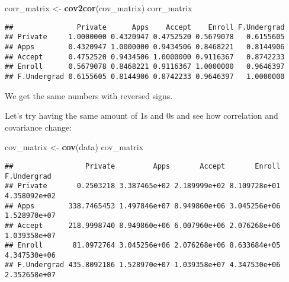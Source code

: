 \documentclass[]{article}
\newenvironment{Shaded}{\begin{snugshade}}{\end{snugshade}}
\newcommand{\DecValTok}[1]{\textcolor[rgb]{0.00,0.00,0.81}{#1}}
\newcommand{\KeywordTok}[1]{\textcolor[rgb]{0.13,0.29,0.53}{\textbf{#1}}}
\newcommand{\NormalTok}[1]{#1}
\newcommand{\OperatorTok}[1]{\textcolor[rgb]{0.81,0.36,0.00}{\textbf{#1}}}
\newcommand{\StringTok}[1]{\textcolor[rgb]{0.31,0.60,0.02}{#1}}
\begin{document}
\begin{Shaded}
\begin{Highlighting}[]
\NormalTok{corr_matrix <-}\StringTok{ }\KeywordTok{cov2cor}\NormalTok{(cov_matrix)}
\NormalTok{corr_matrix}
\end{Highlighting}
\end{Shaded}

\begin{verbatim}
##               Private      Apps    Accept    Enroll F.Undergrad
## Private     1.0000000 0.4320947 0.4752520 0.5679078   0.6155605
## Apps        0.4320947 1.0000000 0.9434506 0.8468221   0.8144906
## Accept      0.4752520 0.9434506 1.0000000 0.9116367   0.8742233
## Enroll      0.5679078 0.8468221 0.9116367 1.0000000   0.9646397
## F.Undergrad 0.6155605 0.8144906 0.8742233 0.9646397   1.0000000
\end{verbatim}

We get the same numbers with reversed signs.

\newpage

Let's try having the same amount of 1s and 0s and see how correlation
and covariance change:

\begin{Shaded}
\end{Shaded}

\begin{Shaded}
\begin{Highlighting}[]
\NormalTok{cov_matrix <-}\StringTok{ }\KeywordTok{cov}\NormalTok{(data)}
\NormalTok{cov_matrix}
\end{Highlighting}
\end{Shaded}

\begin{verbatim}
##                 Private         Apps       Accept       Enroll  F.Undergrad
## Private       0.2503218 3.387465e+02 2.189999e+02 8.109728e+01 4.358092e+02
## Apps        338.7465453 1.497846e+07 8.949860e+06 3.045256e+06 1.528970e+07
## Accept      218.9998740 8.949860e+06 6.007960e+06 2.076268e+06 1.039358e+07
## Enroll       81.0972764 3.045256e+06 2.076268e+06 8.633684e+05 4.347530e+06
## F.Undergrad 435.8092186 1.528970e+07 1.039358e+07 4.347530e+06 2.352658e+07
\end{verbatim}
\end{document}
